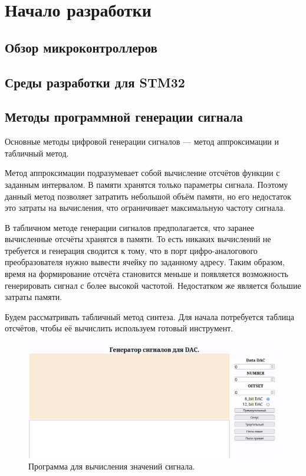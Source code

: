 \chapter{Начало разработки}

\section{Обзор микроконтроллеров}



\section{Среды разработки для STM32}




\section{Методы программной генерации сигнала}
	Основные методы цифровой генерации сигналов --- метод аппроксимации и табличный метод.
	
	Метод аппроксимации подразумевает собой вычисление отсчётов функции с заданным интервалом. В памяти хранятся только параметры сигнала. Поэтому данный метод позволяет затратить небольшой объём памяти, но его недостаток это затраты на вычисления, что ограничивает максимальную частоту сигнала.
	
	В табличном методе генерации сигналов предполагается, что заранее вычисленные отсчёты хранятся в памяти. То есть никаких вычислений не требуется и генерация сводится к тому, что в порт цифро-аналогового преобразователя нужно вывести ячейку по заданному адресу. Таким образом, время на формирование отсчёта становится меньше и появляется возможность генерировать сигнал с более высокой частотой. Недостатком же является большие затраты памяти.
	
	Будем рассматривать табличный метод синтеза. Для начала потребуется таблица отсчётов, чтобы её вычислить используем готовый инструмент.
	
	\begin{figure}[H]
    \centering
    \includegraphics[width=1\textwidth]{../image/lut_prog.png}
    \caption{Программа для вычисления значений сигнала.}
	\end{figure}
	
